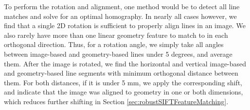 \documentclass[]{spie}  %
\begin{document}
To perform the rotation and alignment, one method would be to detect
all line matches and solve for an optimal homography. In nearly all
cases however, we find that a single 2D rotation is sufficient to
properly align lines in an image. We also rarely have more than one
linear geometry feature to match to in each orthogonal
direction. Thus, for a rotation angle, we simply take all angles
between image-based and geometry-based lines under 5 degrees, and
average them. After the image is rotated, we find the horizontal and
vertical image-based and geometry-based line segments with minimum
orthogonal distance between them. For both distances, if it is under 5
mm, we apply the corresponding shift, and indicate that the image was
aligned to geometry in one or both dimensions, which reduces further
shifting in Section \ref{sec:robustSIFTFeatureMatching}.

\end{document}
